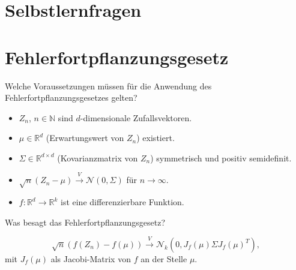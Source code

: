 \section{Selbstlernfragen}

\section*{Fehlerfortpflanzungsgesetz}

\begin{QandA}
    \item Welche Voraussetzungen müssen für die Anwendung des Fehlerfortpflanzungsgesetzes gelten?
    \begin{answered}
        \begin{itemize}
            \item $Z_n$, $n \in \mathbb{N}$ sind $d$-dimensionale Zufallsvektoren.
            \item $\mu \in \mathbb{R}^d$ (Erwartungswert von $Z_n$) existiert.
            \item $\Sigma \in \mathbb{R}^{d \times d}$ (Kovarianzmatrix von $Z_n$) symmetrisch und positiv semidefinit.
            \item $\sqrt{n}(Z_n - \mu) \xrightarrow{V} \mathcal{N}(0, \Sigma)$ für $n \to \infty$.
            \item $f: \mathbb{R}^d \to \mathbb{R}^k$ ist eine differenzierbare Funktion.
        \end{itemize}
    \end{answered}

    \item Was besagt das Fehlerfortpflanzungsgesetz?
    \begin{answered}
        \[
            \sqrt{n}(f(Z_n) - f(\mu)) \xrightarrow{V} \mathcal{N}_k(0, J_f(\mu) \Sigma J_f(\mu)^T),
        \]
        mit $J_f(\mu)$ als Jacobi-Matrix von $f$ an der Stelle $\mu$.
    \end{answered}


\end{QandA}
